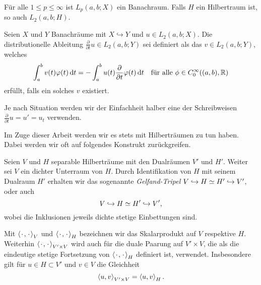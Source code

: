 \begin{Lemma}
\label{lem:gl:br:bochner_ist_banachraum}
    Für alle $1 \leq p \leq \infty$ ist $L_{p}(a, b; X)$ ein Banachraum.
    Falls $H$ ein Hilbertraum ist, so auch $L_{2}(a, b; H)$.
\end{Lemma}

\begin{Definition}
\label{def:gl:br:schwache_zeitableitung}
    Seien $X$ und $Y$ Banachräume mit $X \hookrightarrow Y$ und $u \in L_{2}(a, b; X)$.
    Die distributionelle Ableitung $\frac{\partial}{\partial t} u \in L_{2}(a, b; Y)$ sei definiert als das $v \in L_{2}(a, b; Y)$, welches
    \begin{equation}
        \int_{a}^{b} v(t) \varphi(t) \diff t = - \int_{a}^{b} u(t) \frac{\partial}{\partial t} \varphi(t) \diff t \quad \fa \phi \in C^{\infty}_{0}((a, b), \mathbb{R})
    \end{equation}
    erfüllt, falls ein solches $v$ existiert.
\end{Definition}

\begin{Bemerkung}
    Je nach Situation werden wir der Einfachheit halber eine der Schreibweisen $\frac{\partial}{\partial t} u = u' = u_{t}$ verwenden.
\end{Bemerkung}

Im Zuge dieser Arbeit werden wir es stets mit Hilberträumen zu tun haben.
Dabei werden wir oft auf folgendes Konstrukt zurückgreifen.

\begin{Definition}
\label{def:gl:br:gelfand_tripel}
    Seien $V$ und $H$ separable Hilberträume mit den Dualräumen $V'$ und $H'$.
    Weiter sei $V$ ein dichter Unterraum von $H$.
    Durch Identifikation von $H$ mit seinem Dualraum $H'$ erhalten wir das sogenannte \emph{Gelfand-Tripel} $V \denseinclusion H \simeq H' \denseinclusion V'$, oder auch
    \begin{equation}
        V \denseinclusion H \simeq H' \denseinclusion V',
    \end{equation}
    wobei die Inklusionen jeweils dichte stetige Einbettungen sind.
\end{Definition}

\begin{Bemerkung}
\label{bemekerung:duality_pairing_stetig_und_so}
    Mit $\skprod{\blank}{\blank}_{V}$ und $\skprod{\blank}{\blank}_{H}$ bezeichnen wir das Skalarprodukt auf $V$ respektive $H$.
    Weiterhin $\skprod{\blank}{\blank}_{V' \times V}$ wird auch für die duale Paarung auf $V' \times V$, die als die eindeutige stetige Fortsetzung von $\skprod{\blank}{\blank}_{H}$ definiert ist, verwendet.
    Insbesondere gilt für $u \in H \subset V'$ und $v \in V$ die Gleichheit
    \begin{equation}
        \skprod{u}{v}_{V' \times V} = \skprod{u}{v}_{H}.
    \end{equation}
\end{Bemerkung}

